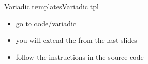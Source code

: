 \begin{frame}[fragile]
  \begin{exerciseWithShortcut}{Variadic templates}{Variadic tpl}
    \begin{itemize}
    \item go to code/variadic
    \item you will extend the  from the last slides
    \item follow the instructions in the source code
    \end{itemize}
  \end{exerciseWithShortcut}
\end{frame}
